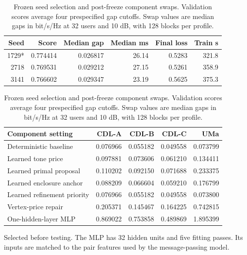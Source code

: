 \documentclass[10pt,letterpaper]{article}
\begin{document}
\begin{table}[htbp]\centering\small
\caption{Frozen seed selection and post-freeze component swaps. Validation scores average four prespecified gap cutoffs. Swap values are median gaps in bit/s/Hz at 32 users and 10 dB, with 128 blocks per profile.}\label{supp:table4}
\begin{tabular}{rrrrrr}\toprule Seed & Score & Median gap & Median ms & Final loss & Train s\\\midrule
1729* & 0.774414 & 0.026817 & 26.14 & 0.5283 & 321.8\\
2718 & 0.769531 & 0.029212 & 27.15 & 0.5261 & 358.9\\
3141 & 0.766602 & 0.029347 & 23.19 & 0.5625 & 375.3\\
\bottomrule\end{tabular}\par\smallskip
\begin{tabular}{lrrrr}\toprule Component setting & CDL-A & CDL-B & CDL-C & UMa\\\midrule
Deterministic baseline & 0.076966 & 0.055182 & 0.049558 & 0.073799\\
Learned tone price & 0.097881 & 0.073606 & 0.061210 & 0.134411\\
Learned primal proposal & 0.110202 & 0.092150 & 0.071688 & 0.233375\\
Learned enclosure anchor & 0.088209 & 0.066604 & 0.059210 & 0.176799\\
Learned refinement priority & 0.076966 & 0.055182 & 0.049558 & 0.073800\\
Vertex-price repair & 0.205371 & 0.145467 & 0.164225 & 0.742815\\
One-hidden-layer MLP & 0.869022 & 0.753858 & 0.489869 & 1.895399\\
\bottomrule\end{tabular}\par\smallskip\footnotesize *Selected before testing. The MLP has 32 hidden units and five fitting passes. Its inputs are matched to the pair features used by the message-passing model.\end{table}
\end{document}
